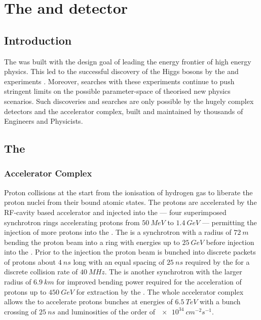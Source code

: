 \chapter{The \LHC and \CMS detector}
\label{chap:detector}


\section{Introduction}

The \LHC was built with the design goal of leading the energy frontier of high
energy physics. This led to the successful discovery of the Higgs bosons by the
\ATLAS \cite{Aad:1471031} and \CMS experiments \cite{Chatrchyan:1471016}.
Moreover, \BSM searches with these experiments continue to push stringent
limits on the possible parameter-space of theorised new physics scenarios. Such
discoveries and searches are only possible by the hugely complex detectors
and the \LHC accelerator complex, built and maintained by thousands of Engineers
and Physicists.

\section{The \LHC}

\subsection{Accelerator Complex}

Proton collisions at the \LHC start from the ionisation of hydrogen gas to
liberate the proton nuclei from their bound atomic states. The protons are
accelerated by the RF-cavity based accelerator \LINACTWO and injected into the
\PSBooster --- four superimposed synchrotron rings accelerating protons from
${\SI{50}{MeV}}$ to ${\SI{1.4}{GeV}}$ --- permitting the injection of more
protons into the \PS. The \PS is a synchrotron with a radius of
${\SI{72}{m}}$ bending the proton beam into a ring with energies up to
${\SI{25}{GeV}}$ before injection into the \SPS. Prior to the injection the
proton beam is bunched into discrete packets of protons about ${\SI{4}{ns}}$
long with an equal spacing of ${\SI{25}{ns}}$ required by the \LHC for a
discrete collision rate of ${\SI{40}{MHz}}$. The \SPS is another synchrotron
with the larger radius of ${\SI{6.9}{km}}$ for improved bending power required
for the acceleration of protons up to ${\SI{450}{GeV}}$ for extraction by the
\LHC. The whole accelerator complex allows the \LHC to accelerate protons
bunches at energies of ${\SI{6.5}{TeV}}$ with a bunch crossing of
${\SI{25}{ns}}$ and luminosities of the order of ${\SI{e34}{cm^{-2}s^{-1}}}$.

